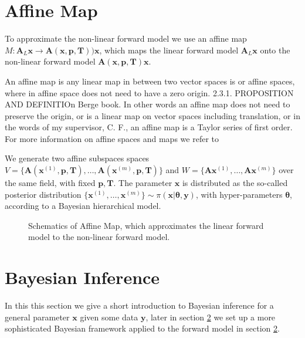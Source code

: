 \section{Affine Map}

To approximate the non-linear forward model we use an affine map $ M:\bm{A}_L \bm{x} \rightarrow \bm{A}(\bm{x},  \bm{p},\bm{T})) \bm{x}$, which maps the linear forward model $\bm{A}_L \bm{x}$ onto the non-linear forward model $\bm{A}(\bm{x},  \bm{p},\bm{T}) \bm{x}$.


An affine map is any linear map in between two vector spaces is or affine spaces, where in affine space does not need to have a zero origin. 2.3.1. PROPOSITION AND DEFINITIOn Berge book\cite{}.
In other words an affine map does not need to preserve the origin, or is a linear map on vector spaces including translation, or in the words of my supervisor, C. F., an affine map is a Taylor series of first order.
For more information on affine spaces and maps we refer to \cite{two books}

We generate two affine subspaces spaces \newline $V = \big\{ \bm{A}(\bm{x}^{(1)}, \bm{p,T}), \dots ,\bm{A}(\bm{x}^{(m)}, \bm{p,T})\big\} $ and $W = \big\{ \bm{A}\bm{x}^{(1)}, \dots ,\bm{A}\bm{x}^{(m)}\big\}$ over the same field, with fixed $\bm{p,T}$.
The parameter $\bm{x}$ is distributed as the so-called posterior distribution $\big\{  \bm{x}^{(1)} , \dots, \bm{x}^{(m)} \big\} \sim \pi(\bm{x}|\bm{\theta},\bm{y})$, with hyper-parameters $\bm{\theta}$, according to a Bayesian hierarchical model.



\begin{figure}[ht!]
	\centering
	\caption[Schematics of Affine Map]{Schematics of Affine Map, which approximates the linear forward model to the non-linear forward model.}
\end{figure}

\section{Bayesian Inference}
In this this section we give a short introduction to Bayesian inference for a general parameter $\bm{x}$ given some data $\bm{y}$, later in section \ref{} we set up a more sophisticated Bayesian framework applied to the forward model in section \ref{}.

